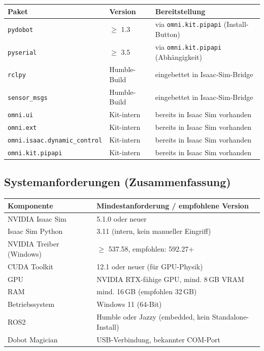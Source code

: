 \documentclass[11pt,a4paper]{article}
\begin{document}
\begin{center}
\begin{tabular}{lll}
  \toprule
  Paket & Version & Bereitstellung \\
  \midrule
  \texttt{pydobot} & $\geq$ 1.3 & via \texttt{omni.kit.pipapi} (Install-Button) \\
  \texttt{pyserial} & $\geq$ 3.5 & via \texttt{omni.kit.pipapi} (Abhängigkeit) \\
  \texttt{rclpy} & Humble-Build & eingebettet in Isaac-Sim-Bridge \\
  \texttt{sensor\_msgs} & Humble-Build & eingebettet in Isaac-Sim-Bridge \\
  \texttt{omni.ui} & Kit-intern & bereits in Isaac Sim vorhanden \\
  \texttt{omni.ext} & Kit-intern & bereits in Isaac Sim vorhanden \\
  \texttt{omni.isaac.dynamic\_control} & Kit-intern & bereits in Isaac Sim vorhanden \\
  \texttt{omni.kit.pipapi} & Kit-intern & bereits in Isaac Sim vorhanden \\
  \bottomrule
\end{tabular}
\end{center}

\subsection{Systemanforderungen (Zusammenfassung)}

\begin{center}
\begin{tabular}{ll}
  \toprule
  Komponente & Mindestanforderung / empfohlene Version \\
  \midrule
  NVIDIA Isaac Sim & 5.1.0 oder neuer \\
  Isaac Sim Python & 3.11 (intern, kein manueller Eingriff) \\
  NVIDIA Treiber (Windows) & $\geq$ 537.58, empfohlen: 592.27+ \\
  CUDA Toolkit & 12.1 oder neuer (für GPU-Physik) \\
  GPU & NVIDIA RTX-fähige GPU, mind. 8\,GB VRAM \\
  RAM & mind. 16\,GB (empfohlen 32\,GB) \\
  Betriebssystem & Windows 11 (64-Bit) \\
  ROS2 & Humble oder Jazzy (embedded, kein Standalone-Install) \\
  Dobot Magician & USB-Verbindung, bekannter COM-Port \\
  \bottomrule
\end{tabular}
\end{center}
\end{document}

